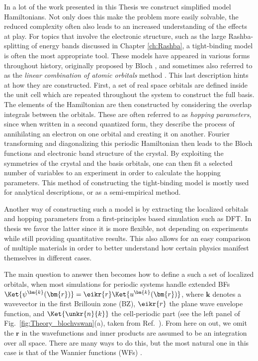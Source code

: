 In a lot of the work presented in this Thesis we construct simplified model Hamiltonians.
Not only does this make the problem more easily solvable, the reduced complexity often also leads to an increased understanding of the effects at play.
For topics that involve the electronic structure, such as the large Rashba-splitting of energy bands discussed in Chapter \ref{ch:Rashba}, a tight-binding model is often the most appropriate tool.
These models have appeared in various forms throughout history, originally proposed by Bloch \cite{Bloch1929}, and sometimes also referred to as the {\it linear combination of atomic orbitals} method \cite{Slater1954}.
This last description hints at how they are constructed.
First, a set of real space orbitals are defined inside the unit cell which are repeated throughout the system to construct the full basis.
The elements of the Hamiltonian are then constructed by considering the overlap integrals between the orbitals.
These are often referred to as {\it hopping parameters}, since when written in a second quantized form, they describe the process of annihilating an electron on one orbital and creating it on another. 
Fourier transforming and diagonalizing this periodic Hamiltonian then leads to the Bloch functions and electronic band structure of the crystal.
By exploiting the symmetries of the crystal and the basis orbitals, one can then fit a selected number of variables to an experiment in order to calculate the hopping parameters.
This method of constructing the tight-binding model is mostly used for analytical descriptions, or as a semi-empirical method.

Another way of constructing such a model is by extracting the localized orbitals and hopping parameters from a first-principles based simulation such as DFT.
In thesis we favor the latter since it is more flexible, not depending on experiments while still providing quantitative results.
This also allows for an easy comparison of multiple materials in order to better understand how certain physics manifest themselves in different cases. 

The main question to answer then becomes how to define a such a set of localized orbitals, when most simulations for periodic systems handle extended BFs $\Ket{\psi^{\bm{k}}(\bm{r})} = \eikr{r} \Ket{u^{\bm{k}}(\bm{r})}$, where $\bm{k}$ denotes a wavevector in the first Brillouin zone (BZ), $\eikr{r}$ the plane wave envelope function, and $\Ket{\unkr{n}{k}}$ the cell-periodic part (see the left panel of Fig.~\ref{fig:Theory_blochvswan}(a), taken from Ref.~\cite{Marzari2012}).
From here on out, we omit the $\bm{r}$ in the wavefunctions and inner products are assumed to be an integration over all space.
There are many ways to do this, but the most natural one in this case is that of the Wannier functions (WFs) \cite{Wannier1937}.

